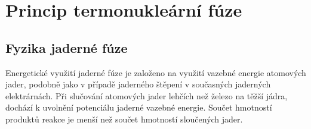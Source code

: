 \documentclass[main.tex]{subfiles}
\begin{document}
\section{Princip termonukleární fúze}
\subsection{Fyzika jaderné fúze}

Energetické využití jaderné fúze je založeno na využití vazebné energie atomových jader, podobně jako v případě jaderného štěpení v současných jaderných elektrárnách. Při slučování atomových jader lehčích než železo na těžší jádra, dochází k uvolnění potenciálu jaderné vazebné energie. Součet hmotností produktů reakce je menší než součet hmotností sloučených jader.
\end{document}
